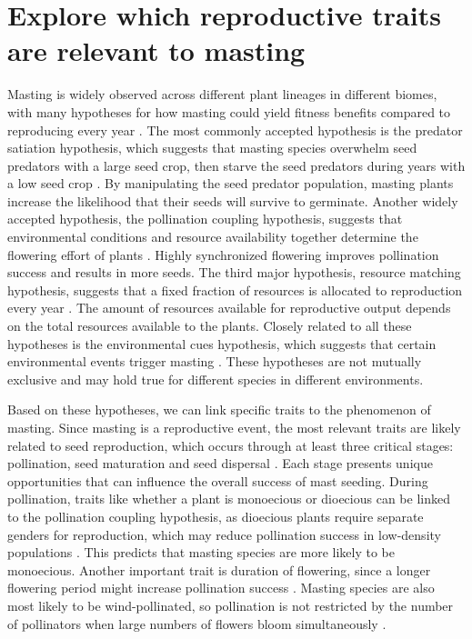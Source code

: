 \documentclass[11pt,letter]{article}
\begin{document}
\section{Explore which reproductive traits are relevant to masting}
Masting is widely observed across different plant lineages in different biomes, with many hypotheses for how masting could yield fitness benefits compared to reproducing every year \citep{koenig2021brief, waller1979models}. The most commonly accepted hypothesis is the predator satiation hypothesis, which suggests that masting species overwhelm seed predators with a large seed crop, then starve the seed predators during years with a low seed crop \citep{janzen1971seed}. By manipulating the seed predator population, masting plants increase the likelihood that their seeds will survive to germinate. Another widely accepted hypothesis, the pollination coupling hypothesis, suggests that environmental conditions and resource availability together determine the flowering effort of plants \citep{crone2014resource}. Highly synchronized flowering improves pollination success and results in more seeds. The third major hypothesis, resource matching hypothesis, suggests that a fixed fraction of resources is allocated to reproduction every year \citep{kelly1994evolutionary}. The amount of resources available for reproductive output depends on the total resources available to the plants. Closely related to all these hypotheses is the environmental cues hypothesis, which suggests that certain environmental events trigger masting \citep{pearse2016mechanisms}. These hypotheses are not mutually exclusive and may hold true for different species in different environments.\par
Based on these hypotheses, we can link specific traits to the phenomenon of masting. Since masting is a reproductive event, the most relevant traits are likely related to seed reproduction, which occurs through at least three critical stages: pollination, seed maturation and seed dispersal \citep{satake2021studying}. Each stage presents unique opportunities that can influence the overall success of mast seeding. During pollination, traits like whether a plant is monoecious or dioecious can be linked to the pollination coupling hypothesis, as dioecious plants require separate genders for reproduction, which may reduce pollination success in low-density populations \citep{bawa1980evolution}. This predicts that masting species are more likely to be monoecious. Another important trait is duration of flowering, since a longer flowering period might increase pollination success \citep{knight2005pollen}. Masting species are also most likely to be wind-pollinated, so pollination is not restricted by the number of pollinators when large numbers of flowers bloom simultaneously \citep{bogdziewicz2017masting, bogdziewicz2020flowering}.\par
\end{document}
